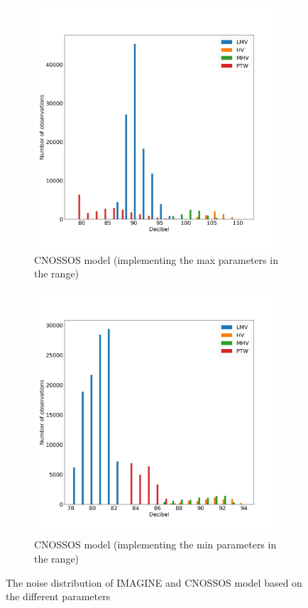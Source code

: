 \documentclass{article}
\begin{document}
\begin{figure}[h]
\newline

\begin{subfigure}{.5\textwidth}
  \centering
  \includegraphics[width=.8\linewidth]{CNOSSOS model max.png}  
  \caption{CNOSSOS model (implementing the max parameters in the range)}
  \label{fig:sub-third}
\end{subfigure}
\begin{subfigure}{.5\textwidth}
  \centering
  \includegraphics[width=.8\linewidth]{CNOSSOS model min.png}  
  \caption{CNOSSOS model (implementing the min parameters in the range)}
  \label{fig:sub-fourth}
\end{subfigure}
\caption{The noise distribution of IMAGINE and CNOSSOS model based on the different parameters}
\label{fig:11}
\end{figure}
\end{document}
